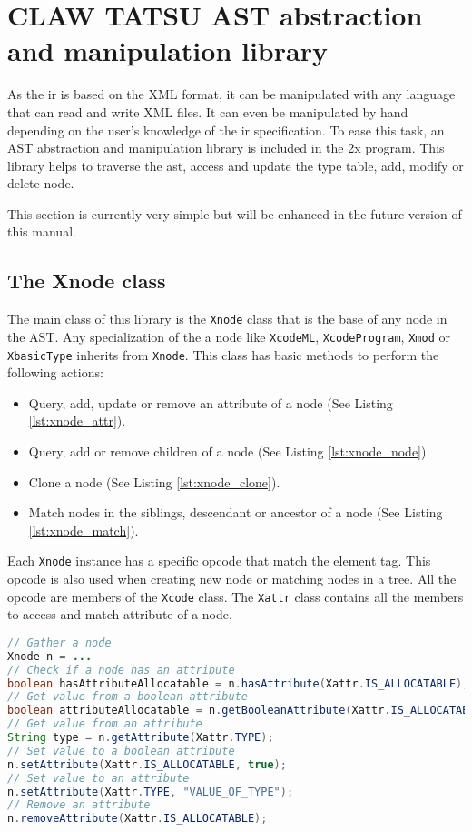 \chapter{CLAW TATSU \xcodemlf AST abstraction and manipulation library}
\label{chapter:clawtatsu}
As the \xcodemlf \gls{ir} is based on the XML format, it can be manipulated with
any language that can read and write XML files. It can even be manipulated by
hand depending on the user's knowledge of the \xcodemlf \gls{ir} specification.
To ease this task, an AST abstraction and manipulation library is included 
in the \cx2x program. This library helps to traverse the \gls{ast}, access and
update the type table, add, modify or delete node.

This section is currently very simple but will be enhanced in the future version
of this manual.

\section{The Xnode class}
The main class of this library is the \lstinline|Xnode| class that is the base
of any node in the AST. 
Any specialization of the a node like \lstinline|XcodeML|, 
\lstinline|XcodeProgram|, \lstinline|Xmod| or \lstinline|XbasicType| inherits 
from \lstinline|Xnode|.
This class has basic methods to perform the following actions:
\begin{itemize}
\item Query, add, update or remove an attribute of a node 
      (See Listing \ref{lst:xnode_attr}).
\item Query, add or remove children of a node (See Listing \ref{lst:xnode_node}).
\item Clone a node (See Listing \ref{lst:xnode_clone}).
\item Match nodes in the siblings, descendant or ancestor of a node 
      (See Listing \ref{lst:xnode_match}).
\end{itemize}

Each \lstinline|Xnode| instance has a specific opcode that match the \xcodemlf 
element tag.
This opcode is also used when creating new node or matching nodes in a tree.
All the opcode are members of the \lstinline|Xcode| class.
The \lstinline|Xattr| class contains all the members to access and match 
attribute of a node. 

\begin{lstlisting}[label=lst:xnode_attr, language=Java, caption=XtypeTable]
// Gather a node
Xnode n = ...
// Check if a node has an attribute
boolean hasAttributeAllocatable = n.hasAttribute(Xattr.IS_ALLOCATABLE);
// Get value from a boolean attribute
boolean attributeAllocatable = n.getBooleanAttribute(Xattr.IS_ALLOCATABLE);
// Get value from an attribute
String type = n.getAttribute(Xattr.TYPE);
// Set value to a boolean attribute
n.setAttribute(Xattr.IS_ALLOCATABLE, true);
// Set value to an attribute
n.setAttribute(Xattr.TYPE, "VALUE_OF_TYPE");
// Remove an attribute
n.removeAttribute(Xattr.IS_ALLOCATABLE);
\end{lstlisting}

